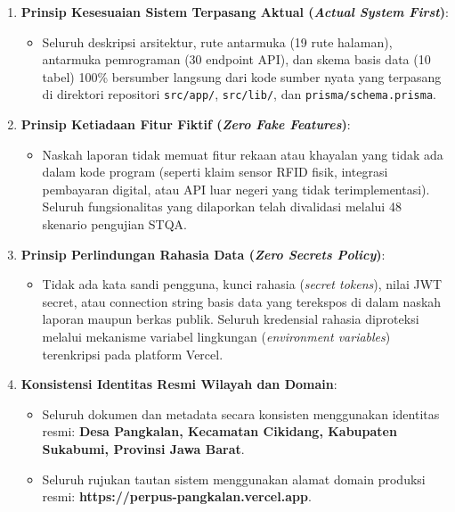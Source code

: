 \documentclass[
  indonesian,
  12pt,
]{report}
\providecommand{\tightlist}{%
  \setlength{\itemsep}{0pt}\setlength{\parskip}{0pt}}
\begin{document}
\begin{enumerate}
\def\labelenumi{\arabic{enumi}.}
\tightlist
\item
  \textbf{Prinsip Kesesuaian Sistem Terpasang Aktual (\emph{Actual
  System First})}:

  \begin{itemize}
  \tightlist
  \item
    Seluruh deskripsi arsitektur, rute antarmuka (19 rute halaman),
    antarmuka pemrograman (30 endpoint API), dan skema basis data (10
    tabel) 100\% bersumber langsung dari kode sumber nyata yang
    terpasang di direktori repositori \texttt{src/app/},
    \texttt{src/lib/}, dan \texttt{prisma/schema.prisma}.
  \end{itemize}
\item
  \textbf{Prinsip Ketiadaan Fitur Fiktif (\emph{Zero Fake Features})}:

  \begin{itemize}
  \tightlist
  \item
    Naskah laporan tidak memuat fitur rekaan atau khayalan yang tidak
    ada dalam kode program (seperti klaim sensor RFID fisik, integrasi
    pembayaran digital, atau API luar negeri yang tidak
    terimplementasi). Seluruh fungsionalitas yang dilaporkan telah
    divalidasi melalui 48 skenario pengujian STQA.
  \end{itemize}
\item
  \textbf{Prinsip Perlindungan Rahasia Data (\emph{Zero Secrets
  Policy})}:

  \begin{itemize}
  \tightlist
  \item
    Tidak ada kata sandi pengguna, kunci rahasia (\emph{secret tokens}),
    nilai JWT secret, atau connection string basis data yang terekspos
    di dalam naskah laporan maupun berkas publik. Seluruh kredensial
    rahasia diproteksi melalui mekanisme variabel lingkungan
    (\emph{environment variables}) terenkripsi pada platform Vercel.
  \end{itemize}
\item
  \textbf{Konsistensi Identitas Resmi Wilayah dan Domain}:

  \begin{itemize}
  \tightlist
  \item
    Seluruh dokumen dan metadata secara konsisten menggunakan identitas
    resmi: \textbf{Desa Pangkalan, Kecamatan Cikidang, Kabupaten
    Sukabumi, Provinsi Jawa Barat}.
  \item
    Seluruh rujukan tautan sistem menggunakan alamat domain produksi
    resmi: \textbf{https://perpus-pangkalan.vercel.app}.
  \end{itemize}
\end{enumerate}
\end{document}
